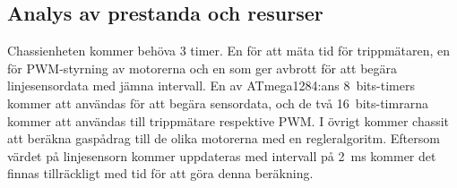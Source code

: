 \subsection{Analys av prestanda och resurser}

Chassienheten kommer behöva 3 timer. En för att mäta tid för trippmätaren, en för PWM-styrning av motorerna och en som ger avbrott för att begära linjesensordata med jämna intervall. En av ATmega1284:ans 8~bits-timers kommer att användas för att begära sensordata, och de två 16~bits-timrarna kommer att användas till trippmätare respektive PWM. I övrigt kommer chassit att beräkna gaspådrag till de olika motorerna med en regleralgoritm. Eftersom värdet på linjesensorn kommer uppdateras med intervall på 2~ms kommer det finnas tillräckligt med tid för att göra denna beräkning.
